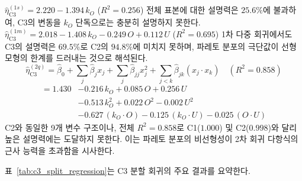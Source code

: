 \subsection{}
\label{subsec:reg_c3}

$\hat{\eta}_{\text{C3}}^{(1s)} = 2.220 - 1.394\,k_O$ ($R^2 = 0.256$)
전체 표본에 대한 설명력은 $25.6\%$에 불과하여, C3의 변동을
$k_O$ 단독으로는 충분히 설명하지 못한다.
 $\hat{\eta}_{\text{C3}}^{(1m)} = 2.018 - 1.408\,k_O - 0.249\,O + 0.112\,U$ ($R^2 = 0.695$)
1차 다중 회귀에서도 C3의 설명력은 $69.5\%$로 C2의 $94.8\%$에
미치지 못하며, 파레토 분포의 극단값이 선형 모형의 한계를
드러내는 것으로 해석된다.
\begin{equation}
  \hat{\eta}_{\text{C3}}^{(2q)} = \hat{\beta}_0
    + \sum_{j} \hat{\beta}_j x_j
    + \sum_{j} \hat{\beta}_{jj} x_j^2
    + \sum_{j<k} \hat{\beta}_{jk} (x_j \cdot x_k)
  \quad (R^2 = 0.858)
\end{equation}
\begin{equation}
  \begin{aligned}
    = 1.430
    &- 0.216\,k_O + 0.085\,O + 0.256\,U \\
    &- 0.513\,k_O^2 + 0.022\,O^2 - 0.002\,U^2 \\
    &- 0.627\,(k_O \cdot O) - 0.125\,(k_O \cdot U) - 0.025\,(O \cdot U)
  \end{aligned}
\end{equation}
C2와 동일한 9개 변수 구조이나, 전체 $R^2 = 0.858$로
C1($1.000$) 및 C2($0.998$)와 달리 높은 설명력에는 도달하지 못한다.
이는 파레토 분포의 비선형성이 2차 회귀 다항식의 근사 능력을 초과함을 시사한다.


\p{[}표~\vref{tab:c3_split_regression}\p{]}는 C3 분할 회귀의 주요 결과를 요약한다.

